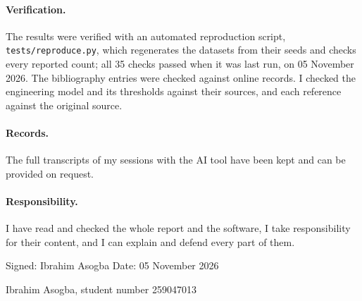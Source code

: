 \paragraph{Verification.} The results were verified with an automated reproduction script, \texttt{tests/reproduce.py}, which regenerates the datasets from their seeds and checks every reported count; all 35 checks passed when it was last run, on 05 November 2026. The bibliography entries were checked against online records. I checked the engineering model and its thresholds against their sources, and each reference against the original source.

\paragraph{Records.} The full transcripts of my sessions with the AI tool have been kept and can be provided on request.

\paragraph{Responsibility.} I have read and checked the whole report and the software, I take responsibility for their content, and I can explain and defend every part of them.

\vspace{2em}
\noindent Signed: Ibrahim Asogba \hfill Date: 05 November 2026

\noindent Ibrahim Asogba, student number 259047013
